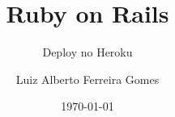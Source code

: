 \author{Luiz Alberto Ferreira Gomes}
\title{Ruby on Rails}
\subtitle{Deploy no Heroku}
\date{\today}
